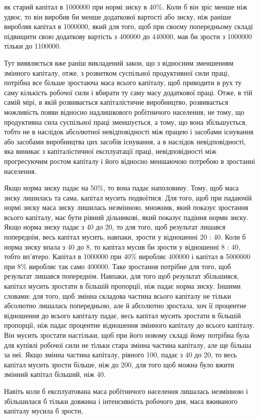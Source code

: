 \parcont{}  %
як старий капітал в 1000000 при нормі зиску в 40\%. Коли б він
зріс менше ніж удвоє, то він виробив би менше додаткової
вартості або зиску, ніж раніше виробляв капітал в 1000000,
який для того, щоб при своєму попередньому складі підвищити
свою додаткову вартість з 400000 до 440000, мав би зрости
з 1000000 тільки до 1100000.

Тут виявляється вже раніш викладений закон, що з відносним
зменшенням змінного капіталу, отже, з розвитком суспільної
продуктивної сили праці, потрібна все більше зростаюча маса
всього капіталу, щоб приводити в рух ту саму кількість робочої
сили і вбирати ту саму масу додаткової праці. Отже, в тій
самій мірі, в якій розвивається капіталістичне виробництво, розвивається
можливість появи відносно надлишкового робітничого
населення, не тому, що продуктивна сила суспільної праці зменшується,
а тому, що вона збільшується, тобто не в наслідок
абсолютної невідповідності між працею і засобами існування
або засобами виробництва цих засобів існування, а в наслідок
невідповідності, яка виникає з капіталістичної експлуатації праці,
невідповідності між прогресуючим ростом капіталу і його відносно
меншаючою потребою в зростанні населення.

Якщо норма зиску падає на 50\%, то вона падає наполовину.
Тому, щоб маса зиску лишилась та сама, капітал мусить подвоїтися.
Для того, щоб при падаючій нормі зиску маса зиску лишилась
незмінною, множник, який показує зростання всього капіталу,
має бути рівний дільникові, який показує падіння норми зиску.
Якщо норма зиску падає з 40 до 20, то для того, щоб результат
лишався попереднім, весь капітал мусить, навпаки, зрости у відношенні
20 : 40. Коли б норма зиску впала з 40 до 8, то капітал
мусив би зрости у відношенні 8 : 40, тобто вп’ятеро. Капітал
в 1000000 при 40\% виробляє 400000 і капітал в 5000000 при 8\%
виробляє так само 400000. Таке зростання потрібне для того, щоб
результат лишався попереднім. Навпаки, для того щоб результат
збільшився, капітал мусить зростати в більшій пропорції, ніж
падає норма зиску. Іншими словами: для того, щоб змінна складова
частина всього капіталу не тільки абсолютно лишалась
попередньою, але й абсолютно зростала, хоч її процентне відношення
до всього капіталу падає, весь капітал мусить зростати
в більшій пропорції, ніж падає процентне відношення змінного
капіталу до всього капіталу. Він мусить зростати настільки,
щоб при його новому складі йому потрібна була для купівлі
робочої сили не тільки стара змінна частина капіталу, але ще
більша за неї. Якщо змінна частина капіталу, рівного 100,
падає з 40 до 20, то весь капітал мусить зрости більше, ніж до
200, для того щоб можна було вжити змінний капітал більший,
ніж 40.

Навіть коли б експлуатована маса робітничого населення
лишалась незмінною і збільшилася б тільки довжина і інтенсивність
робочого дня, маса вживаного капіталу мусила б зрости,
\parbreak{}  %
